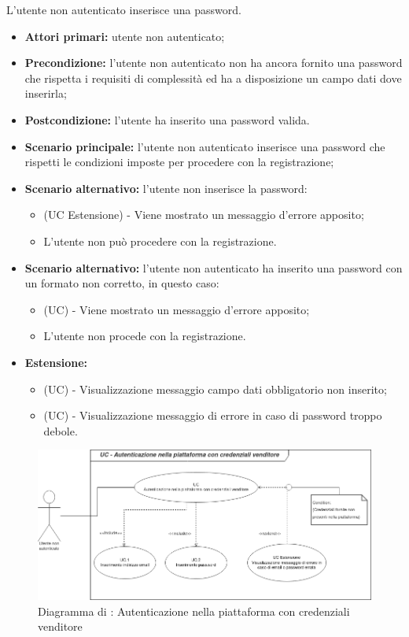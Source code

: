 L'utente non autenticato inserisce una password.
\begin{itemize}
	\item \textbf{Attori primari:} utente non autenticato;
	\item \textbf{Precondizione:} l'utente non autenticato non ha ancora fornito una password che rispetta i requisiti di complessità ed ha a disposizione un campo dati dove inserirla;
	\item \textbf{Postcondizione:} l'utente ha inserito una password valida.
	\item \textbf{Scenario principale:} l'utente non autenticato inserisce una password che rispetti le condizioni imposte per procedere con la registrazione;
	\item \textbf{Scenario alternativo:} l'utente non inserisce la password:
	\begin{itemize}
		\item (UC Estensione) - Viene mostrato un messaggio d'errore apposito;
		\item L'utente non può procedere con la registrazione.
	\end{itemize}
	\item \textbf{Scenario alternativo:} l'utente non autenticato ha inserito una password con un formato non corretto, in	questo caso:
	\begin{itemize}
		\item (UC) - Viene mostrato un messaggio d'errore apposito;
		\item L'utente non procede con la registrazione.
	\end{itemize}
	\item \textbf{Estensione:}
	\begin{itemize}
		\item (UC) - Visualizzazione messaggio campo dati obbligatorio non inserito;
		\item (UC) - Visualizzazione messaggio di errore in caso di password troppo debole.
	\end{itemize}
\end{itemize}

\begin{figure}[H]
    \centering
    \includegraphics[scale=0.6]{Immagini/DiagrammiUC/AccessoVenditore.png}
    \caption{Diagramma di \actualUC: Autenticazione nella piattaforma con credenziali venditore} 
    \label{fig:LoginVenditore}
\end{figure}

